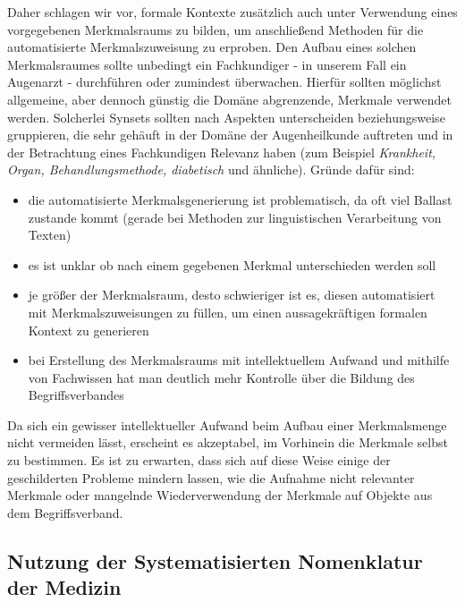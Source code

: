 \documentclass[pagesize,paper=A4,DIV=calc,fontsize=12pt,draft=false]{scrreprt}
\begin{document}
Daher schlagen wir vor, formale Kontexte zusätzlich auch unter Verwendung eines vorgegebenen Merkmalsraums zu bilden, um anschließend Methoden für die automatisierte Merkmalszuweisung zu erproben.
Den Aufbau eines solchen Merkmalsraumes sollte unbedingt ein Fachkundiger - in unserem Fall ein Augenarzt - durchführen oder zumindest überwachen. 
Hierfür sollten möglichst allgemeine, aber dennoch günstig die Domäne abgrenzende, Merkmale verwendet werden.
Solcherlei Synsets sollten nach Aspekten unterscheiden beziehungsweise gruppieren, die sehr gehäuft in der Domäne der Augenheilkunde auftreten und in der Betrachtung eines Fachkundigen Relevanz haben (zum Beispiel \textit{Krankheit, Organ, Behandlungsmethode, diabetisch} und ähnliche). 
Gründe dafür sind:
\begin{itemize}
\item die automatisierte Merkmalsgenerierung ist problematisch, da oft viel Ballast zustande kommt (gerade bei Methoden zur linguistischen Verarbeitung von Texten)
\item es ist unklar ob nach einem gegebenen Merkmal unterschieden werden soll
\item je größer der Merkmalsraum, desto schwieriger ist es, diesen automatisiert mit Merkmalszuweisungen zu füllen, um einen aussagekräftigen formalen Kontext zu generieren
\item bei Erstellung des Merkmalsraums mit intellektuellem Aufwand und mithilfe von Fachwissen hat man deutlich mehr Kontrolle über die Bildung des Begriffsverbandes
\end{itemize}
Da sich ein gewisser intellektueller Aufwand beim Aufbau einer Merkmalsmenge nicht vermeiden lässt, erscheint es akzeptabel, im Vorhinein die Merkmale selbst zu bestimmen.
Es ist zu erwarten, dass sich auf diese Weise einige der geschilderten Probleme mindern lassen, wie die Aufnahme nicht relevanter Merkmale oder mangelnde Wiederverwendung der Merkmale auf Objekte aus dem Begriffsverband. 

\subsection{Nutzung der Systematisierten Nomenklatur der Medizin}
\end{document}

